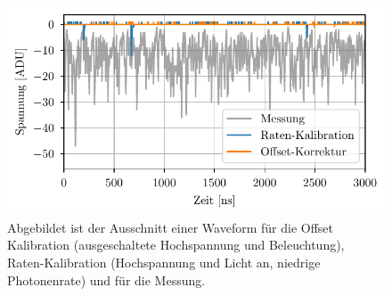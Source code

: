 \begin{figure}[h]
    \centering
    \includegraphics{images/Datenaufnahme/Kalibration.pdf}
    \caption{Abgebildet ist der Ausschnitt einer Waveform für die Offset Kalibration (ausgeschaltete Hochspannung und Beleuchtung), Raten-Kalibration (Hochspannung und Licht an, niedrige Photonenrate) und für die Messung.}
    \label{fig:Offest_Rate Kalibration}
\end{figure}

